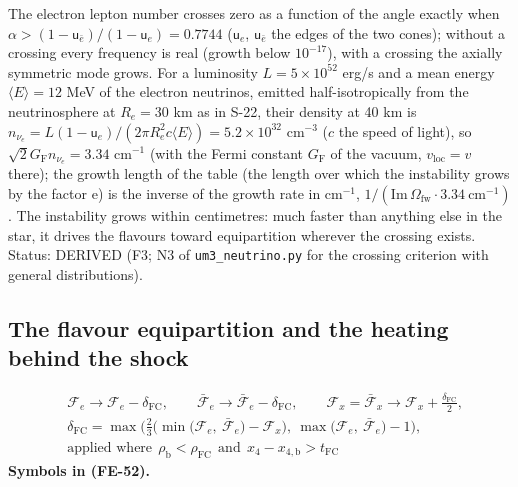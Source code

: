 \documentclass[
  10pt,
]{article}
\begin{document}
The electron lepton number crosses zero as a function of the angle
exactly when
\(\alpha > (1 - \mathsf{u}_{\bar e})/(1 - \mathsf{u}_e) = 0.7744\)
(\(\mathsf{u}_e\), \(\mathsf{u}_{\bar e}\) the edges of the two cones);
without a crossing every frequency is real (growth below \(10^{-17}\)),
with a crossing the axially symmetric mode grows. For a luminosity
\(L = 5\times10^{52}\) erg/s and a mean energy \(\langle E\rangle = 12\)
MeV of the electron neutrinos, emitted half-isotropically from the
neutrinosphere at \(R_e = 30\) km as in S-22, their density at 40 km is
\(n_{\nu_e} = L(1 - \mathsf{u}_e)/(2\pi R_e^2c\langle E\rangle) = 5.2\times10^{32}\)
cm\(^{-3}\) (\(c\) the speed of light), so
\(\sqrt2G_{\mathrm{F}}n_{\nu_e} = 3.34\) cm\(^{-1}\) (with the Fermi
constant \(G_{\mathrm{F}}\) of the vacuum, \(v_{\mathrm{loc}} = v\)
there); the growth length of the table (the length over which the
instability grows by the factor \(\mathrm{e}\)) is the inverse of the
growth rate in cm\(^{-1}\),
\(1/(\mathrm{Im}\,\Omega_{\mathrm{fw}}\cdot3.34\ \text{cm}^{-1})\). The
instability grows within centimetres: much faster than anything else in
the star, it drives the flavours toward equipartition wherever the
crossing exists. Status: DERIVED (F3; N3 of \texttt{um3\_neutrino.py}
for the crossing criterion with general distributions).

\hypertarget{the-flavour-equipartition-and-the-heating-behind-the-shock}{%
\subsection{The flavour equipartition and the heating behind the
shock}\label{the-flavour-equipartition-and-the-heating-behind-the-shock}}

\[
\begin{aligned}
&\mathcal{F}_{e} \to \mathcal{F}_{e} - \delta_{\mathrm{FC}},\qquad \bar{\mathcal{F}}_{e} \to \bar{\mathcal{F}}_{e} - \delta_{\mathrm{FC}},\qquad
 \mathcal{F}_{x} = \bar{\mathcal{F}}_{x} \to \mathcal{F}_{x} + \frac{\delta_{\mathrm{FC}}}{2},\\
&\delta_{\mathrm{FC}} = \max\Big(\frac23\Big(\min\big(\mathcal{F}_{e},\ \bar{\mathcal{F}}_{e}\big) - \mathcal{F}_{x}\Big),\ \max\big(\mathcal{F}_{e},\ \bar{\mathcal{F}}_{e}\big) - 1\Big),\\
&\text{applied where}\ \ \rho_{\mathrm{b}} < \rho_{\mathrm{FC}}\ \ \text{and}\ \ x_4 - x_{4,\mathrm{b}} > t_{\mathrm{FC}}
\end{aligned} \tag{FE-52}
\] \textbf{Symbols in (FE-52).}
\end{document}
